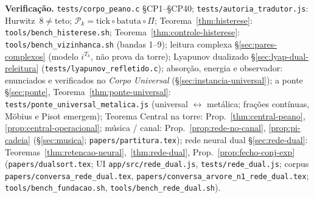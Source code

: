 \documentclass[11pt,a4paper]{article}
\newcommand{\code}[1]{\texttt{#1}}
\begin{document}
\bigskip
\noindent\textbf{Verificação.} \code{tests/corpo\_peano.c} §CP1--§CP40;
\code{tests/autoria\_tradutor.js}: Hurwitz~$8\neq$teto;
$\mathcal{P}_k=\mathrm{tick}\circ\mathrm{batuta}\circ\Pi$;
Teorema~\ref{thm:histerese}: \code{tools/bench\_histerese.sh};
Teorema~\ref{thm:controle-histerese}: \code{tools/bench\_vizinhanca.sh}
(bandas 1--9);
leitura complexa \S\ref{sec:pares-complexos} (modelo $i^{T_k}$,
não prova da torre);
Lyapunov dualizado \S\ref{sec:lyap-dual-releitura}
(\code{tests/lyapunov\_refletido.c});
absorção, energia e observador: enunciados e verificados no
\emph{Corpo Universal} (\S\ref{sec:instancia-universal});
a ponte \S\ref{sec:ponte}, Teorema~\ref{thm:ponte-universal}:
\code{tests/ponte\_universal\_metalica.js} (universal $\leftrightarrow$
metálica; frações contínuas, Möbius e Pisot emergem);
Teorema Central na torre: Prop.~\ref{thm:central-peano},
\ref{prop:central-operacional};
música / canal: Prop.~\ref{prop:rede-no-canal},
\ref{prop:pi-cadeia}
(\S\ref{sec:musica}; \code{papers/partitura.tex});
rede neural dual \S\ref{sec:rede-dual}:
Teoremas~\ref{thm:retencao-neural},~\ref{thm:rede-dual},
Prop.~\ref{prop:fecho-conj-exp}
(\code{papers/dualsort.tex}; UI \code{app/src/rede\_dual.js},
\code{tests/rede\_dual.js};
corpus \code{papers/conversa\_rede\_dual.tex},
\code{papers/conversa\_arvore\_n1\_rede\_dual.tex};
\code{tools/bench\_fundacao.sh},
\code{tools/bench\_rede\_dual.sh}).
\end{document}
